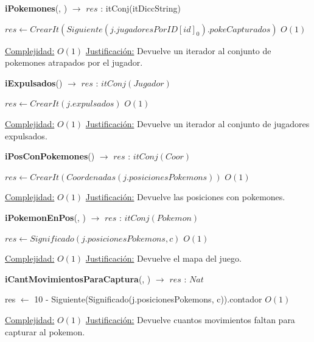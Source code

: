 \begin{algorithm}[H]{\textbf{iPokemones}(, ) $\to$ $res$ : itConj(itDiccString)} 
	{}
	\begin{algorithmic}
		\State $res \gets CrearIt(Siguiente(j.jugadoresPorID[id]_0).pokeCapturados) $ \Comment $O(1)$
	
		\medskip
		\Statex \underline{Complejidad:} $O(1)$
		\Statex \underline{Justificación:} Devuelve un iterador al conjunto de pokemones atrapados por el jugador.
    \end{algorithmic}
\end{algorithm}

\begin{algorithm}[H]{\textbf{iExpulsados}() $\to$ $res$ : $itConj(Jugador)$} 
	{}
	\begin{algorithmic}
		\State $res \gets CrearIt(j.expulsados) $ \Comment $O(1)$
	
		\medskip
		\Statex \underline{Complejidad:} $O(1)$
		\Statex \underline{Justificación:} Devuelve un iterador al conjunto de jugadores expulsados.
    \end{algorithmic}
\end{algorithm}

\begin{algorithm}[H]{\textbf{iPosConPokemones}() $\to$ $res$ : $itConj(Coor)$} 
	{}
	\begin{algorithmic}
		\State $res \gets CrearIt(Coordenadas(j.posicionesPokemons)) $ \Comment $O(1)$
	
		\medskip
		\Statex \underline{Complejidad:} $O(1)$
		\Statex \underline{Justificación:} Devuelve las posiciones con pokemones.
    \end{algorithmic}
\end{algorithm}

\begin{algorithm}[H]{\textbf{iPokemonEnPos}(, ) $\to$ $res$ : $itConj(Pokemon)$} 
	{}
	\begin{algorithmic}
		\State $res \gets Significado(j.posicionesPokemons, c) $ \Comment $O(1)$
	
		\medskip
		\Statex \underline{Complejidad:} $O(1)$
		\Statex \underline{Justificación:} Devuelve el mapa del juego.
    \end{algorithmic}
\end{algorithm}

\begin{algorithm}[H]{\textbf{iCantMovimientosParaCaptura}(, ) $\to$ $res$ : $Nat$} 
	{}
	\begin{algorithmic}
		\State res $\gets$ 10 - Siguiente(Significado(j.posicionesPokemons, c)).contador  \Comment $O(1)$
	
		\medskip
		\Statex \underline{Complejidad:} $O(1)$
		\Statex \underline{Justificación:} Devuelve cuantos movimientos faltan para capturar al pokemon.
    \end{algorithmic}
\end{algorithm}

